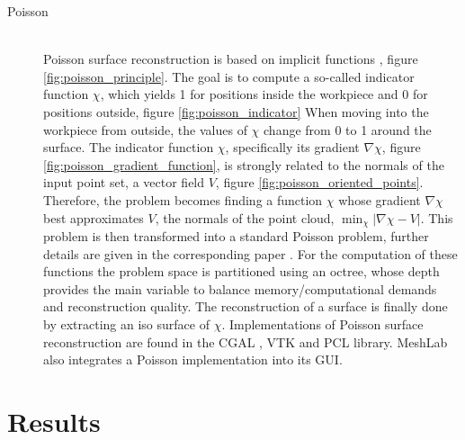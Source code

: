 \begin{description}
	\item[Poisson] \hfill \\
	Poisson surface reconstruction is based on implicit functions \cite{poisson}, \cf figure \ref{fig:poisson_principle}.
	The goal is to compute a so-called indicator function $\chi$, which yields 1 for positions inside the workpiece and 0 for positions outside, \cf figure \ref{fig:poisson_indicator}
	When moving into the workpiece from outside, the values of $\chi$ change from 0 to 1 around the surface.
	The indicator function $\chi$, specifically its gradient $\nabla\chi$, \cf figure \ref{fig:poisson_gradient_function}, is strongly related to the normals of the input point set, a vector field $V$, \cf figure \ref{fig:poisson_oriented_points}.
	Therefore, the problem becomes finding a function $\chi$ whose gradient $\nabla\chi$ best approximates $V$, the normals of the point cloud, \ie $\min_\chi |\nabla\chi - V|$.
	This problem is then transformed into a standard Poisson problem, further details are given in the corresponding paper \cite{poisson}.
	For the computation of these functions the problem space is partitioned using an octree, whose depth provides the main variable to balance memory/computational demands and reconstruction quality.
	The reconstruction of a surface is finally done by extracting an iso surface of $\chi$.
	Implementations of Poisson surface reconstruction are found in \eg the CGAL \cite{cgal_poisson}, VTK \cite{vtk_poisson} and PCL \cite{pcl} library.
	MeshLab also integrates a Poisson implementation into its GUI.
\end{description}


\section{Results}
\label{sec:point_cloud_results}

